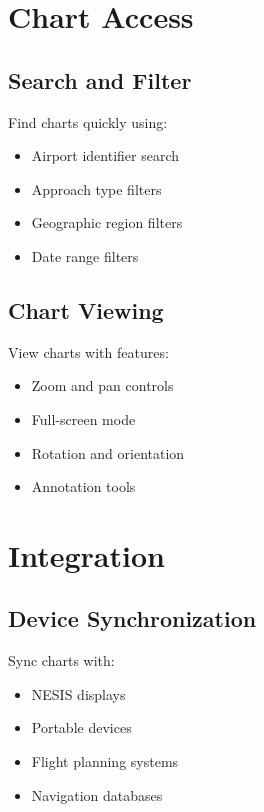 \section{Chart Access}

\subsection{Search and Filter}

Find charts quickly using:
\begin{itemize}
    \item Airport identifier search
    \item Approach type filters
    \item Geographic region filters
    \item Date range filters
\end{itemize}

\subsection{Chart Viewing}

View charts with features:
\begin{itemize}
    \item Zoom and pan controls
    \item Full-screen mode
    \item Rotation and orientation
    \item Annotation tools
\end{itemize}

\section{Integration}

\subsection{Device Synchronization}

Sync charts with:
\begin{itemize}
    \item NESIS displays
    \item Portable devices
    \item Flight planning systems
    \item Navigation databases
\end{itemize}
